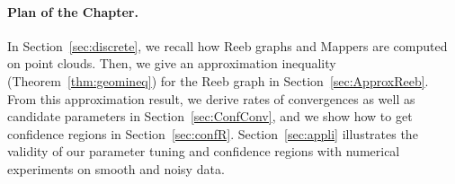 %

%


\paragraph*{Plan of the Chapter.} In Section~\ref{sec:discrete}, we recall
how Reeb graphs and Mappers are computed on point clouds. Then,  %
we give an approximation inequality (Theorem~\ref{thm:geomineq}) for the Reeb graph in Section~\ref{sec:ApproxReeb}. 
From this approximation result, we derive rates of 
convergences as well as candidate parameters in Section~\ref{sec:ConfConv}, 
and we show how to get confidence regions in Section~\ref{sec:confR}. 
Section~\ref{sec:appli} illustrates the validity of our parameter tuning and
confidence regions with numerical experiments on smooth and noisy data.

